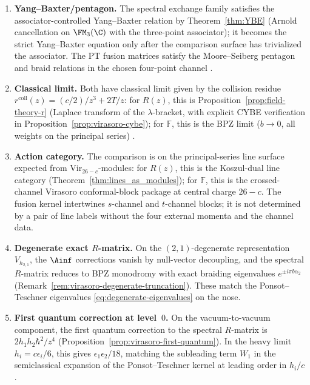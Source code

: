 \begin{proposition}
\label{prop:threefold-evidence}
\begin{enumerate}[label=\textup{(\roman*)}]
\item \textbf{Yang--Baxter/pentagon.} The spectral exchange family
 satisfies the associator-controlled Yang--Baxter relation by
 Theorem~\textup{\ref{thm:YBE}} (Arnold cancellation on
 $\FM_3(\C)$ with the three-point associator); it becomes the strict
 Yang--Baxter equation only after the comparison surface has
 trivialized the associator. The PT fusion matrices satisfy the
 Moore--Seiberg pentagon and braid relations in the chosen four-point
 channel \textup{\cite{PT01, TeschnerLiouville}}.

\item \textbf{Classical limit.} Both have classical limit
 given by the collision residue
 $r^{\mathrm{coll}}(z) = (c/2)/z^3 + 2T/z$: for $R(z)$,
 this is Proposition~\textup{\ref{prop:field-theory-r}} (Laplace
 transform of the $\lambda$-bracket, with explicit CYBE verification
 in Proposition~\textup{\ref{prop:virasoro-cybe}}); for $\mathbb{F}$,
 this is the BPZ limit ($b \to 0$, all weights on the principal
 series) \textup{\cite{TeschnerLiouville}}.

\item \textbf{Action category.}
 The comparison is on the principal-series line surface expected from
 $\mathrm{Vir}_{26-c}$-modules: for $R(z)$, this is the Koszul-dual
 line category (Theorem~\textup{\ref{thm:lines_as_modules}}); for
 $\mathbb{F}$, this is the crossed-channel Virasoro conformal-block
 package at central charge $26-c$. The fusion kernel intertwines
 $s$-channel and $t$-channel blocks; it is not determined by a pair of
 line labels without the four external momenta and the channel data.

\item \textbf{Degenerate exact $R$-matrix.}
 On the $(2,1)$-degenerate representation $V_{h_{2,1}}$, the
 $\Ainf$ corrections vanish by null-vector decoupling, and the
 spectral $R$-matrix reduces to BPZ monodromy with exact
 braiding eigenvalues $e^{\pm i\pi b\alpha_2}$
 \textup{(}Remark~\textup{\ref{rem:virasoro-degenerate-truncation}}\textup{)}.
 These match the Ponsot--Teschner eigenvalues
 \eqref{eq:degenerate-eigenvalues} on the nose.

\item \textbf{First quantum correction at level~$0$.}
 On the vacuum-to-vacuum component, the first quantum correction
 to the spectral $R$-matrix is $2h_1 h_2 \hbar^2/z^4$
 \textup{(}Proposition~\textup{\ref{prop:virasoro-first-quantum}}\textup{)}.
 In the heavy limit $h_i = c\epsilon_i/6$, this gives
 $\epsilon_1\epsilon_2/18$, matching the subleading term $W_1$ in
 the semiclassical expansion of the Ponsot--Teschner kernel at
 leading order in $h_i/c$.
\end{enumerate}
\end{proposition}
\label{subsec:evidence-category}

